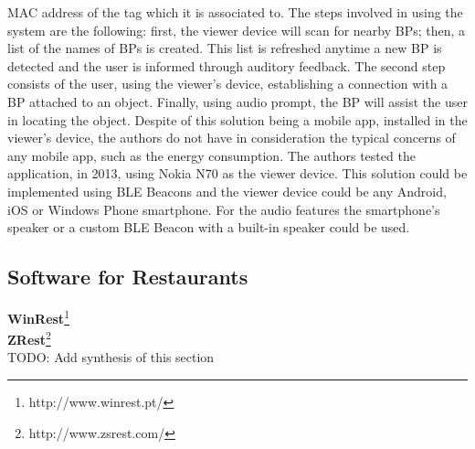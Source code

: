 MAC address of the tag which it is associated to.
The steps involved in using the system are the
following: first, the viewer device will scan
for nearby BPs; then, a list of the names of
BPs is created. This list is refreshed anytime a new
BP is detected and the user is informed through auditory
feedback. The second step consists of the user, using
the viewer's device, establishing a connection with a BP
attached to an object. Finally, using audio prompt, the BP
will assist the user in locating the object.
Despite of this solution being a mobile app, installed
in the viewer's device, the authors do not have in
consideration the typical concerns of any mobile app,
such as the energy consumption.
The authors tested the application, in 2013,
using Nokia N70 as the viewer device.
This solution could be implemented using BLE Beacons
and the viewer device could be any Android, iOS or
Windows Phone smartphone.
For the audio features the smartphone's speaker or
a custom BLE Beacon with a built-in speaker could be
used.

\subsection{Software for Restaurants}
\label{subs:software_for_restaurants}
\textbf{WinRest}\footnote{http://www.winrest.pt/}
\\
\textbf{ZRest}\footnote{http://www.zsrest.com/}
\\

TODO: Add synthesis of this section
